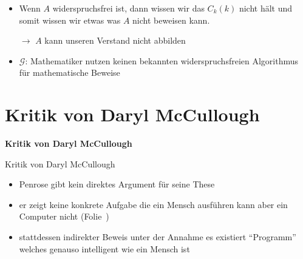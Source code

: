 \begin{frame}
    \begin{itemize}
        \item Wenn $A$ widerspruchsfrei ist, dann wissen wir das $C_k(k)$ nicht hält und somit wissen wir etwas was $A$ nicht beweisen kann.
        \item[$\rightarrow$] $A$ kann unseren Verstand nicht abbilden
        \item $\mathscr{G}$: Mathematiker nutzen keinen bekannten widerspruchsfreien Algorithmus für mathematische Beweise
    \end{itemize}
\end{frame}

%
%

\section{Kritik von Daryl McCullough}
\label{sec:critic_mccullough}

\begin{frame}
    \vspace*{\fill}
        \begin{center}
            \Huge \textbf{Kritik von Daryl McCullough}
        \end{center}
    \vspace*{\fill}
\end{frame}

\begin{frame}{Kritik von Daryl McCullough \cite{mccullough1995can}}
    \begin{itemize}
        \item Penrose gibt kein direktes Argument für seine These
        \item er zeigt keine konkrete Aufgabe die ein Mensch ausführen kann aber ein Computer nicht (Folie~\pageref{sec:visual_proof})
        \item stattdessen indirekter Beweis unter der Annahme es existiert \enquote{Programm} welches genauso intelligent wie ein Mensch ist
    \end{itemize}
\end{frame}

